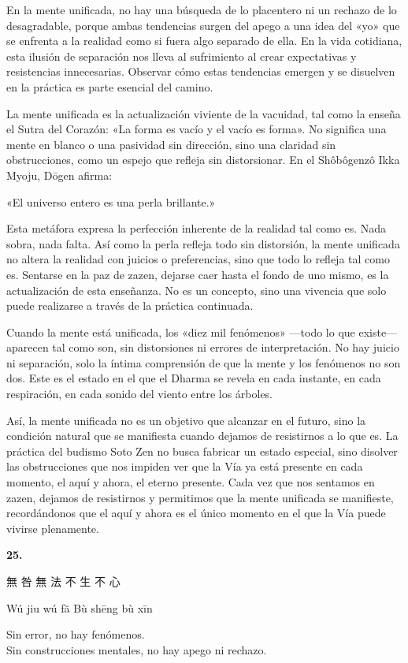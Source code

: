 \documentclass[
  a5paperpaper,
]{article}
\begin{document}
En la mente unificada, no hay una búsqueda de lo placentero ni un
rechazo de lo desagradable, porque ambas tendencias surgen del apego a
una idea del «yo» que se enfrenta a la realidad como si fuera algo
separado de ella. En la vida cotidiana, esta ilusión de separación nos
lleva al sufrimiento al crear expectativas y resistencias innecesarias.
Observar cómo estas tendencias emergen y se disuelven en la práctica es
parte esencial del camino.

La mente unificada es la actualización viviente de la vacuidad, tal como
la enseña el Sutra del Corazón: «La forma es vacío y el vacío es forma».
No significa una mente en blanco o una pasividad sin dirección, sino una
claridad sin obstrucciones, como un espejo que refleja sin distorsionar.
En el Shôbôgenzô Ikka Myoju, Dōgen afirma:

«El universo entero es una perla brillante.»

Esta metáfora expresa la perfección inherente de la realidad tal como
es. Nada sobra, nada falta. Así como la perla refleja todo sin
distorsión, la mente unificada no altera la realidad con juicios o
preferencias, sino que todo lo refleja tal como es. Sentarse en la paz
de zazen, dejarse caer hasta el fondo de uno mismo, es la actualización
de esta enseñanza. No es un concepto, sino una vivencia que solo puede
realizarse a través de la práctica continuada.

Cuando la mente está unificada, los «diez mil fenómenos» ---todo lo que
existe--- aparecen tal como son, sin distorsiones ni errores de
interpretación. No hay juicio ni separación, solo la íntima comprensión
de que la mente y los fenómenos no son dos. Este es el estado en el que
el Dharma se revela en cada instante, en cada respiración, en cada
sonido del viento entre los árboles.

Así, la mente unificada no es un objetivo que alcanzar en el futuro,
sino la condición natural que se manifiesta cuando dejamos de
resistirnos a lo que es. La práctica del budismo Soto Zen no busca
fabricar un estado especial, sino disolver las obstrucciones que nos
impiden ver que la Vía ya está presente en cada momento, el aquí y
ahora, el eterno presente. Cada vez que nos sentamos en zazen, dejamos
de resistirnos y permitimos que la mente unificada se manifieste,
recordándonos que el aquí y ahora es el único momento en el que la Vía
puede vivirse plenamente.

\hfill\break

\hypertarget{05}{}
\begin{verseblock}

\newpage

\begin{center}\textbf{25.}\end{center}

無 咎 無 法 不 生 不 心

Wú jiu wú fă Bù shēng bù xīn

Sin error, no hay fenómenos.\\
Sin construcciones mentales, no hay apego ni rechazo.

\end{verseblock}
\end{document}
